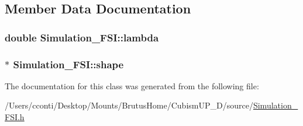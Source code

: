 \subsection{Member Data Documentation}
\hypertarget{class_simulation___f_s_i_a3546333c7042859fc9b1706604cd744d}{}
\subsubsection[{lambda}]{\setlength{\rightskip}{0pt plus 5cm}double Simulation\+\_\+\+F\+S\+I\+::lambda\hspace{0.3cm}{\ttfamily [protected]}}\label{class_simulation___f_s_i_a3546333c7042859fc9b1706604cd744d}
\hypertarget{class_simulation___f_s_i_a57f9bd36f7f37bf62dc4bed30c7f2111}{}
\subsubsection[{shape}]{$\ast$ Simulation\+\_\+\+F\+S\+I\+::shape\hspace{0.3cm}{\ttfamily [protected]}}\label{class_simulation___f_s_i_a57f9bd36f7f37bf62dc4bed30c7f2111}


The documentation for this class was generated from the following file\+:\begin{DoxyCompactItemize}
\item 
/\+Users/cconti/\+Desktop/\+Mounts/\+Brutus\+Home/\+Cubism\+U\+P\+\_\+D/source/\hyperlink{_simulation___f_s_i_8h}{Simulation\+\_\+\+F\+S\+I.\+h}\end{DoxyCompactItemize}
